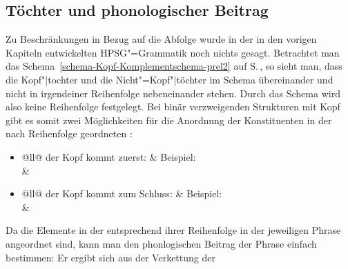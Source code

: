 \subsection{Töchter und phonologischer Beitrag}

Zu Beschränkungen in Bezug auf die Abfolge wurde in der in den vorigen Kapiteln entwickelten
HPSG"=Grammatik noch nichts gesagt. Betrachtet man das
Schema~\ref{schema-Kopf-Komplementschema-prel2} auf S.\,\pageref{schema-Kopf-Komplementschema-prel2}, so sieht man,
dass die Kopf"|tochter und die Nicht"=Kopf"|töchter im Schema übereinander und nicht in irgendeiner
Reihenfolge nebeneinander stehen. Durch das Schema wird also keine Reihenfolge festgelegt. Bei binär
verzweigenden Strukturen mit Kopf gibt es somit zwei Möglichkeiten für die Anordnung der
Konstituenten in der nach Reihenfolge geordneten \dtrsl:
\begin{itemize}
\item \begin{tabular}[t]{@{}ll@{}}
der Kopf kommt zuerst:                                   & Beispiel:\\
%
&%
\\
\end{tabular}
\item \begin{tabular}[t]{@{}ll@{}}
der Kopf kommt zum Schluss:                            & Beispiel:\\
%
&%
\\
\end{tabular}
\end{itemize}
Da die Elemente in der \dtrsl entsprechend ihrer Reihenfolge in der jeweiligen Phrase angeordnet sind, kann man
den phonlogischen Beitrag der Phrase einfach bestimmen: Er ergibt sich aus der Verkettung der
